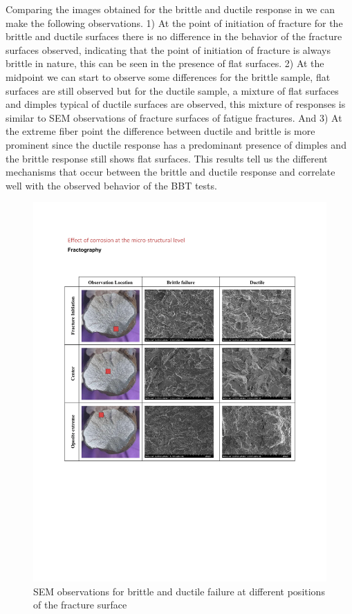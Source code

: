 Comparing the images obtained for the brittle and ductile response in  we can make the following observations. 1) At the point of initiation of fracture for the brittle and ductile surfaces there is no difference in the behavior of the fracture surfaces observed, indicating that the point of initiation of fracture is always brittle in nature, this can be seen in the presence of flat surfaces. 2) At the midpoint we can start to observe some differences for the brittle sample, flat surfaces are still observed but for the ductile sample, a mixture of flat surfaces and dimples typical of ductile surfaces are observed, this mixture of responses is similar to SEM observations of fracture surfaces of fatigue fractures. And 3) At the extreme fiber point the difference between ductile and brittle is more prominent since the ductile response has a predominant presence of dimples and the  brittle response still shows flat surfaces. This results tell us the different mechanisms that occur between the brittle and ductile response and correlate well with the observed behavior of the BBT tests.

\begin{figure}[htbp]
	\centering
	\includegraphics[width=1\textwidth]{VAC Thesis 2.0/Chapter-4/figs/BBT_fractography.pdf}
	\caption{SEM observations for brittle and ductile failure at different positions of the fracture surface}
	\label{fig:FractureSurfaces}
\end{figure}

